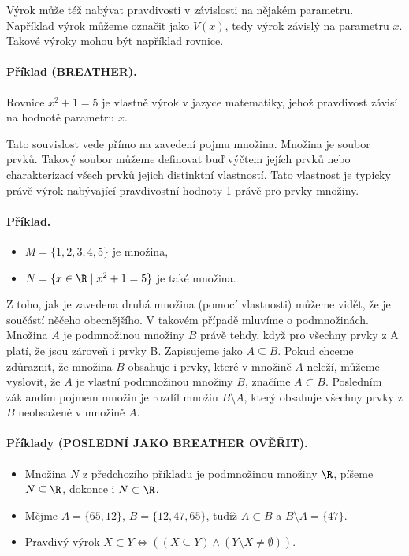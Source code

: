 \documentclass[11pt,a4paper]{article}
\begin{document}
            Výrok může též nabývat pravdivosti v závislosti na nějakém parametru. Například výrok  můžeme označit jako $V(x)$, tedy výrok závislý na parametru $x$. Takové výroky mohou být například rovnice.
            \paragraph{Příklad (BREATHER).}
            Rovnice $x^2 + 1 = 5$ je vlastně výrok v jazyce matematiky, jehož pravdivost závisí na hodnotě parametru $x$.

            Tato souvislost vede přímo na zavedení pojmu množina. Množina je soubor prvků. Takový soubor můžeme definovat buď výčtem jejích prvků nebo charakterizací všech prvků jejich distinktní vlastností. Tato vlastnost je typicky právě výrok nabývající pravdivostní hodnoty 1 právě pro prvky množiny.
            \paragraph{Příklad.}
            \begin{itemize}
                \item $M = \{1,2,3,4,5\}$ je množina,
                \item $N = \{x \in \R \mid x^2 + 1 = 5\}$ je také množina.
            \end{itemize}

            Z toho, jak je zavedena druhá množina (pomocí vlastnosti) můžeme vidět, že je součástí něčeho obecnějšího. V takovém případě mluvíme o podmnožinách. Množina $A$ je podmnožinou množiny $B$ právě tehdy, když pro všechny prvky z A platí, že jsou zároveň i prvky B. Zapisujeme jako $A \subseteq B$. Pokud chceme zdůraznit, že množina $B$ obsahuje i prvky, které v množině $A$ neleží, můžeme vyslovit, že $A$ je vlastní podmnožinou množiny $B$, značíme $A \subset B$. Posledním záklandím pojmem množin je rozdíl množin $B \setminus A$, který obsahuje všechny prvky z $B$ neobsažené v množině $A$.
            \paragraph*{Příklady (POSLEDNÍ JAKO BREATHER OVĚŘIT).}
            \begin{itemize}
                \item Množina $N$ z předchozího příkladu je podmnožinou množiny $\R$, píšeme $N \subseteq \R$, dokonce i $N \subset \R$.
                \item Mějme $A = \{65,12\}$, $B = \{12,47,65\}$, tudíž $A \subset B$ a $B \setminus A = \{47\}$.
                \item Pravdivý výrok $X \subset Y \iff ((X \subseteq Y) \wedge (Y \setminus X \neq \emptyset))$.
            \end{itemize}
\end{document}
